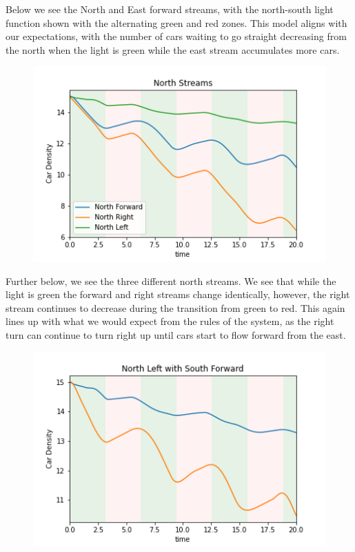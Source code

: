 \documentclass[12pt]{article}
\begin{document}
Below we see the North and East forward streams, with the north-south light function shown with the alternating green and red zones. This model aligns with our expectations, with the number of cars waiting to go straight decreasing from the north when the light is green while the east stream accumulates more cars.\\

\begin{figure}[h!]
    \centering
    \includegraphics[width=12cm]{figures/NorthStreams.png}
    \label{fig:diagram}
\end{figure}

Further below, we see the three different north streams. We see that while the light is green the forward and right streams change identically, however, the right stream continues to decrease during the transition from green to red. This again lines up with what we would expect from the rules of the system, as the right turn can continue to turn right up until cars start to flow forward from the east.\\

\begin{figure}[h!]
    \centering
    \includegraphics[width=12cm]{figures/NorthLeftwithSouthForward.png}
    \label{fig:diagram}
\end{figure}
\end{document}
